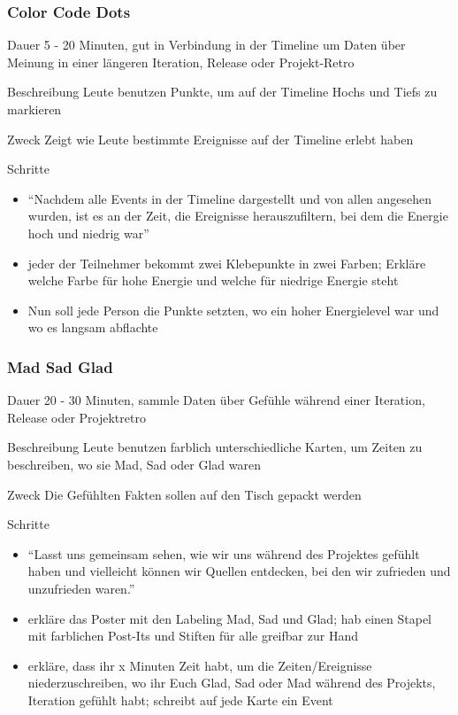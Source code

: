 \subsubsection{Color Code Dots}
\begin{Beschreibungfett}[Beschreibung]
  \item [Dauer] 5 - 20 Minuten, gut in Verbindung in der Timeline um Daten über
    Meinung in einer längeren Iteration, Release oder Projekt-Retro
  \item [Beschreibung] Leute benutzen Punkte, um auf der Timeline Hochs und Tiefs zu
    markieren
  \item [Zweck] Zeigt wie Leute bestimmte Ereignisse auf der Timeline erlebt haben
  \item [Schritte]
    \begin{itemize}
      \item \enquote{Nachdem alle Events in der Timeline dargestellt und von allen angesehen wurden, ist es
          an der Zeit, die Ereignisse herauszufiltern, bei dem die Energie hoch und niedrig war}
      \item jeder der Teilnehmer bekommt zwei Klebepunkte in zwei Farben; Erkläre welche Farbe für hohe Energie und
        welche für niedrige Energie steht
      \item Nun soll jede Person die Punkte setzten, wo ein hoher Energielevel war und wo es langsam abflachte
    \end{itemize}
\end{Beschreibungfett}


\subsubsection{Mad Sad Glad}
\begin{Beschreibungfett}[Beschreibung]
  \item [Dauer] 20 - 30 Minuten, sammle Daten über Gefühle während einer Iteration,
    Release oder Projektretro
  \item [Beschreibung] Leute benutzen farblich unterschiedliche Karten, um Zeiten zu beschreiben, wo sie Mad, Sad oder Glad waren
  \item [Zweck] Die Gefühlten Fakten sollen auf den Tisch gepackt werden
  \item [Schritte]
    \begin{itemize}
      \item \enquote{Lasst uns gemeinsam sehen, wie wir uns während des Projektes
          gefühlt haben und vielleicht können wir Quellen entdecken, bei den wir zufrieden und
          unzufrieden waren.}
      \item erkläre das Poster mit den Labeling Mad, Sad und Glad; hab einen Stapel mit
        farblichen Post-Its und Stiften für alle greifbar zur Hand
      \item erkläre, dass ihr x Minuten Zeit habt, um die Zeiten/Ereignisse niederzuschreiben, wo
        ihr Euch Glad, Sad oder Mad während des Projekts, Iteration gefühlt habt; schreibt auf jede Karte ein Event
    \end{itemize}
\end{Beschreibungfett}


